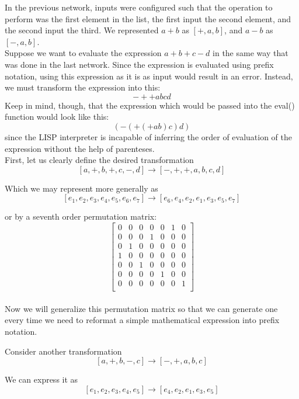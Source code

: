 \documentclass[./Research.tex]{subfiles}
\begin{document}
\def\layersep{2.5cm}

	In the previous network, inputs were configured such that the operation to perform was the first element in the list, the first input the second element, and the second input the third.
We represented $a + b$ as $[+, a, b]$, and $a - b$ as $[-, a, b]$. \\

	Suppose we want to evaluate the expression $a + b + c - d$ in the same way that was done in the last network. Since the expression is evaluated using prefix notation, using this expression as it is as input would result in an error. Instead, we must transform the expression into this: $$- + + a b c d$$ Keep in mind, though, that the expression which would be passed into the eval() function would look like this: $$(- (+ (+ a b) c) d)$$ since the LISP interpreter is incapable of inferring the order of evaluation of the expression without the help of parenteses. \\
	
	First, let us clearly define the desired transformation
		$$[a, +, b, +, c, -, d] \rightarrow [-, +, +, a, b, c, d]$$
	
	Which we may represent more generally as
		$$[e_{1}, e_{2}, e_{3}, e_{4}, e_{5}, e_{6}, e_{7}] 
		\rightarrow [e_{6}, e_{4}, e_{2}, e_{1}, e_{3}, e_{5}, e_{7}]$$ 

	or by a seventh order permutation matrix:
		\[ \begin{bmatrix}
    		0 & 0 & 0 & 0 & 0 & 1 & 0 \\
    		0 & 0 & 0 & 1 & 0 & 0 & 0 \\
    		0 & 1 & 0 & 0 & 0 & 0 & 0 \\
    		1 & 0 & 0 & 0 & 0 & 0 & 0 \\
    		0 & 0 & 1 & 0 & 0 & 0 & 0 \\
    		0 & 0 & 0 & 0 & 1 & 0 & 0 \\
    		0 & 0 & 0 & 0 & 0 & 0 & 1 \\
		\end{bmatrix} \] \\
		
	Now we will generalize this permutation matrix so that we can generate one every time we need to reformat a simple mathematical expression into prefix notation.
	
	Consider another transformation \\
		$$[a, +, b, -, c] \rightarrow [-, +, a, b, c]$$
	
	We can express it as
		$$[e_{1}, e_{2}, e_{3}, e_{4}, e_{5}] 
		\rightarrow [e_{4}, e_{2}, e_{1}, e_{3}, e_{5}]$$ 
	
\end{document}
